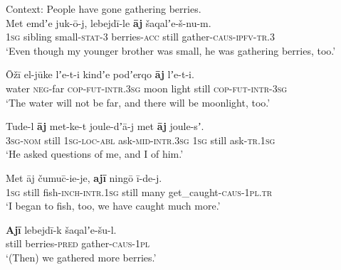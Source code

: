 \begin{exe}
	\ex\label{exAppendixKolymaAdditiveAlso1}
	Context: People have gone gathering berries.\\
	\gll Met emdʼe juk-ō-j, lebejdī-le \textbf{āj} šaqalʼe-š-nu-m.\\
	1\textsc{sg} sibling small-\textsc{stat}-3 berries-\textsc{acc} still gather-\textsc{caus}-\textsc{ipfv}-\textsc{tr}.3\\
	\glt \lq Even though my younger brother was small, he was gathering berries, too.' \parencite[146, 160]{YukaghirTexts}
	
	\ex\label{exAppendixKolymaAdditiveAlso2}
	\gll Ōžī el-jūke lʼe-t-i kindʼe podʼerqo \textbf{āj} lʼe-t-i.\\
	water \textsc{neg}-far \textsc{cop}-\textsc{fut}-\textsc{intr}.3\textsc{sg} moon light still \textsc{cop}-\textsc{fut}-\textsc{intr}-3\textsc{sg}\\
	\glt \lq The water will not be far, and there will be moonlight, too.\rq{ }\parencite[530]{Maslova2003}
	
	\ex\label{exAppendixKolymaAdditiveAlso3}
	\gll Tude-l \textbf{āj} met-ke-t joule-dʼā-j met \textbf{āj} joule-sʼ.\\
	3\textsc{sg}-\textsc{nom} still 1\textsc{sg}-\textsc{loc}-\textsc{abl} ask-\textsc{mid}-\textsc{intr}.3\textsc{sg} 1\textsc{sg} still ask-\textsc{tr}.1\textsc{sg}\\
	\glt \lq He asked questions of me, and I of him.\rq{ }\parencite[142, 159]{YukaghirTexts}

	\ex\label{exAppendixKolymaIncrement1}
	\gll Met āj	čumuc̄-ie-je, \textbf{ajī} ningō ī-de-j.\\
	1\textsc{sg} still fish-\textsc{inch}-\textsc{intr}.1\textsc{sg} still many get\_caught-\textsc{caus}-1\textsc{pl}.\textsc{tr}\\
	\glt \lq I began to fish, too, we have caught much more.\rq{ }\parencite[532]{Maslova2003}
	
	\ex\label{exAppendixKolymaIncrement2}
	\gll \textbf{Ajī} lebejdī-k šaqalʼe-šu-l.\\
	still berries-\textsc{pred} gather-\textsc{caus}-1\textsc{pl}\\
	\glt \lq (Then) we gathered more berries.\rq{ }\parencite[532]{Maslova2003}
\end{exe}

